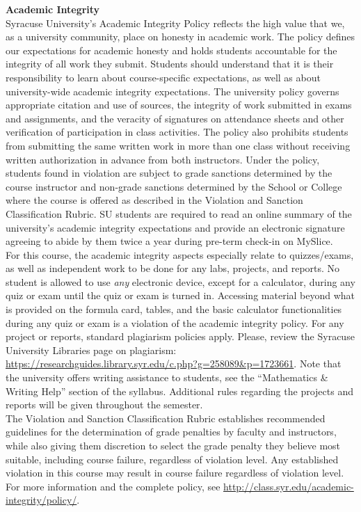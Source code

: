 \documentclass[11pt,letterpaper]{article}
\newcommand{\lefthead}[2]{\noindent\textbf{#1}\hfill\\[#2]}
\begin{document}
\lefthead{Academic Integrity}{0.3cm}
\noindent Syracuse University's Academic Integrity Policy reflects the high value that we, as a university community, place on honesty in academic work. The policy defines our expectations for academic honesty and holds students accountable for the integrity of all work they submit. Students should understand that it is their responsibility to learn about course-specific expectations, as well as about university-wide academic integrity expectations. The university policy governs appropriate citation and use of sources, the integrity of work submitted in exams and assignments, and the veracity of signatures on attendance sheets and other verification of participation in class activities. The policy also prohibits students from submitting the same written work in more than one class without receiving written authorization in advance from both instructors. Under the policy, students found in violation are subject to grade sanctions determined by the course instructor and non-grade sanctions determined by the School or College where the course is offered as described in the Violation and Sanction Classification Rubric. SU students are required to read an online summary of the university's academic integrity expectations and provide an electronic signature agreeing to abide by them twice a year during pre-term check-in on MySlice. \\

\noindent For this course, the academic integrity aspects especially relate to quizzes/exams, as well as independent work to be done for any labs, projects, and reports. No student is allowed to use \emph{any} electronic device, except for a calculator, during any quiz or exam until the quiz or exam is turned in. Accessing material beyond what is provided on the formula card, tables, and the basic calculator functionalities during any quiz or exam is a violation of the academic integrity policy. For any project or reports, standard plagiarism policies apply. Please, review the Syracuse University Libraries page on plagiarism: \url{https://researchguides.library.syr.edu/c.php?g=258089&p=1723661}. Note that the university offers writing assistance to students, see the ``Mathematics \& Writing Help'' section of the syllabus. Additional rules regarding the projects and reports will be given throughout the semester. \\

\noindent The Violation and Sanction Classification Rubric establishes recommended guidelines for the determination of grade penalties by faculty and instructors, while also giving them discretion to select the grade penalty they believe most suitable, including course failure, regardless of violation level. Any established violation in this course may result in course failure regardless of violation level. For more information and the complete policy, see \url{http://class.syr.edu/academic-integrity/policy/}.  \\[0.3cm]
\end{document}
